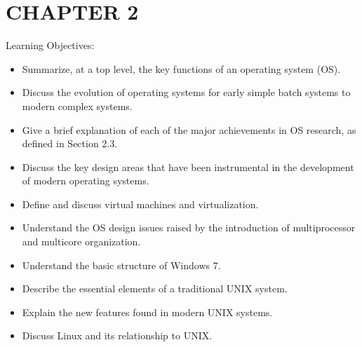 \documentclass{article}
\begin{document}
\section*{CHAPTER 2}
	Learning Objectives:
	\begin{itemize}
		\item Summarize, at a top level, the key functions of an operating system (OS).
		\item Discuss the evolution of operating systems for early simple batch systems to modern complex systems.
		\item Give a brief explanation of each of the major achievements in OS research, as defined in Section 2.3.
		\item Discuss the key design areas that have been instrumental in the development of modern operating systems.
		\item Define and discuss virtual machines and virtualization.
		\item Understand the OS design issues raised by the introduction of multiprocessor and multicore organization.
		\item Understand the basic structure of Windows 7.
		\item Describe the essential elements of a traditional UNIX system.
		\item Explain the new features found in modern UNIX systems.
		\item Discuss Linux and its relationship to UNIX.
	\end{itemize}
\end{document}
